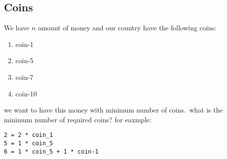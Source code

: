 \subsection{Coins}

We have $n$ amount of money and our country have the following coins:

\begin{enumerate}
  \item coin-1
  \item coin-5
  \item coin-7
  \item coin-10
\end{enumerate}

we want to have this money with minimum number of coins.\ what is the minimum number of required coins?
for eaxmple:

\begin{verbatim}
2 = 2 * coin_1
5 = 1 * coin_5
6 = 1 * coin_5 + 1 * coin-1
\end{verbatim}
